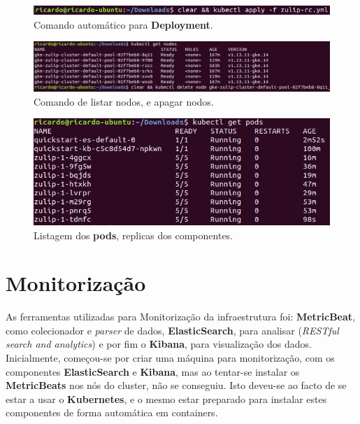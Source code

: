 \begin{figure}[h!]
\centering
\includegraphics[scale=0.70]{images/5.png}
\caption{Comando automático para \textbf{Deployment}.}
\label{img:kub}
\end{figure}

\begin{figure}[h!]
\centering
\includegraphics[scale=0.51]{images/3.png}
\caption{Comando de listar nodos, e apagar nodos.}
\end{figure}

\begin{figure}[h!]
\centering
\includegraphics[scale=0.80]{images/2.png}
\caption{Listagem dos \textbf{pods}, replicas dos componentes.}
\end{figure}






\chapter{Monitorização}
As ferramentas utilizadas para Monitorização da infraestrutura foi: \textbf{MetricBeat}, como colecionador e \emph{parser} de dados, \textbf{ElasticSearch}, para analisar (\emph{RESTful search and analytics}) e por fim o \textbf{Kibana}, para visualização dos dados. \newline
Inicialmente, começou-se por criar uma máquina para monitorização, com os componentes \textbf{ElasticSearch} e \textbf{Kibana}, mas ao tentar-se instalar os \textbf{MetricBeats} nos nós do cluster, não se conseguiu. Isto deveu-se ao facto de se estar a usar o \textbf{Kubernetes}, e o mesmo estar preparado para instalar estes componentes de forma automática em containers. \newline 

